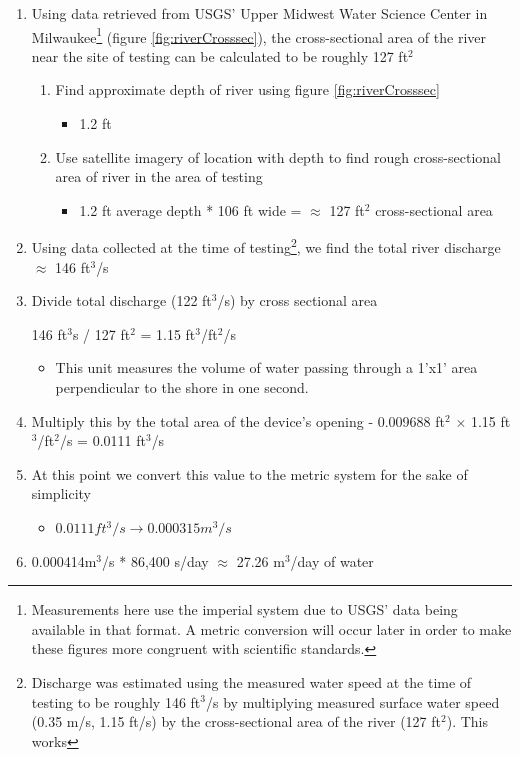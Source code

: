 \documentclass[fleqn,10pt]{SelfArx} %
\begin{document}
	\begin{enumerate}
		\item Using data retrieved from USGS’ Upper Midwest Water Science Center in Milwaukee\footnote{Measurements here use the imperial system due to USGS' data being available in that format. A metric conversion will occur later in order to make these figures more congruent with scientific standards.} (figure \ref{fig:riverCrosssec}), the cross-sectional area of the river near the site of testing can be calculated to be roughly 127 ft$^2$
		\begin{enumerate}
			\item Find approximate depth of river using figure \ref{fig:riverCrosssec} 
			
			\begin{itemize}
				\item 1.2 ft 
			\end{itemize}
			
			\item Use satellite imagery of location with depth to find rough cross-sectional area of river in the area of testing 
			\begin{itemize}
				\item 1.2 ft average depth * 106 ft wide =  $\approx$ 127 ft$^2$ cross-sectional area
			\end{itemize}
		\end{enumerate}
		\item Using data collected at the time of testing\footnote{Discharge was estimated using the measured water speed at the time of testing to be roughly 146 ft$^3$/s by multiplying measured surface water speed (0.35 m/s, 1.15 ft/s) by the cross-sectional area of the river (127 ft$^2$). This works }, we find the total river discharge $\approx$ 146 ft$^3$/s
		
		\item Divide total discharge (122 ft$^3$/s) by cross sectional area 
		
		146 ft$^3$s / 127 ft$^2$ = 1.15 ft$^3$/ft$^2$/s
		
		\begin{itemize}
			\item This unit measures the volume of water passing through a 1’x1’ area perpendicular to the shore in one second. 
		\end{itemize}
		\item Multiply this by the total area of the device’s opening - 0.009688 ft$^2$ $\times$ 1.15 ft$^3$/ft$^2$/s = 0.0111 ft$^3$/s
		\item At this point we convert this value to the metric system for the sake of simplicity 
		
		\begin{itemize}
			\item $0.0111 ft^3/s \rightarrow 0.000315 m^3/s$
		\end{itemize}
		
		\item 0.000414m$^3$/s * 86,400 s/day $\approx$ 27.26 m$^3$/day of water
		
		
	\end{enumerate}
\end{document}
